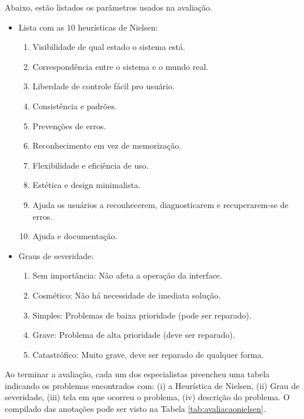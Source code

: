 Abaixo, estão listados os parâmetros usados na avaliação.

\begin{itemize}
    \item Lista com as 10 heurísticas de Nielsen:
    \begin{enumerate}
        \item Visibilidade de qual estado o sistema está.
        \item Correspondência entre o sistema e o mundo real.
        \item Liberdade de controle fácil pro usuário.
        \item Consistência e padrões.
        \item Prevenções de erros.
        \item Reconhecimento em vez de memorização.
        \item Flexibilidade e eficiência de uso.
        \item Estética e design minimalista.
        \item Ajuda os usuários a reconhecerem, diagnosticarem e recuperarem-se de erros.
        \item Ajuda e documentação.
    \end{enumerate}

    \item Graus de severidade:
    \begin{enumerate}
        \addtocounter{enumi}{-1} %
        \item Sem importância: Nâo afeta a operação da interface.
        \item Cosmético: Não há necessidade de imediata solução.
        \item Simples: Problemas de baixa prioridade (pode ser reparado).
        \item Grave: Problema de alta prioridade (deve ser reparado).
        \item Catastrófico: Muito grave, deve ser reparado de qualquer forma.
    \end{enumerate}
\end{itemize}

Ao terminar a avaliação, cada um dos especialistas preencheu uma tabela indicando os problemas encontrados com: (i) a Heurística de Nielsen, (ii) Grau de severidade, (iii) tela em que ocorreu o problema, (iv) descrição do problema. O compilado das anotações pode ser visto na Tabela \ref{tab:avaliacaonielsen}.

